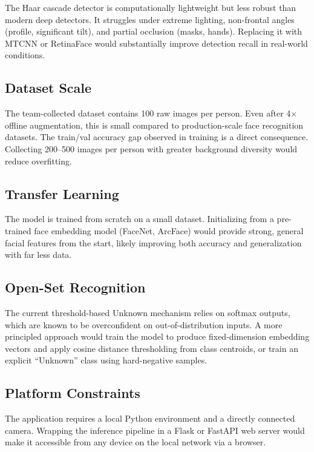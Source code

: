 \documentclass[12pt,a4paper]{article}
\begin{document}
The Haar cascade detector is computationally lightweight but less robust than modern deep detectors. It struggles under extreme lighting, non-frontal angles (profile, significant tilt), and partial occlusion (masks, hands). Replacing it with MTCNN or RetinaFace would substantially improve detection recall in real-world conditions.

\subsection{Dataset Scale}

The team-collected dataset contains 100 raw images per person. Even after 4$\times$ offline augmentation, this is small compared to production-scale face recognition datasets. The train/val accuracy gap observed in training is a direct consequence. Collecting 200–500 images per person with greater background diversity would reduce overfitting.

\subsection{Transfer Learning}

The model is trained from scratch on a small dataset. Initializing from a pre-trained face embedding model (FaceNet, ArcFace) would provide strong, general facial features from the start, likely improving both accuracy and generalization with far less data.

\subsection{Open-Set Recognition}

The current threshold-based Unknown mechanism relies on softmax outputs, which are known to be overconfident on out-of-distribution inputs. A more principled approach would train the model to produce fixed-dimension embedding vectors and apply cosine distance thresholding from class centroids, or train an explicit ``Unknown'' class using hard-negative samples.

\subsection{Platform Constraints}

The application requires a local Python environment and a directly connected camera. Wrapping the inference pipeline in a Flask or FastAPI web server would make it accessible from any device on the local network via a browser.
\end{document}
